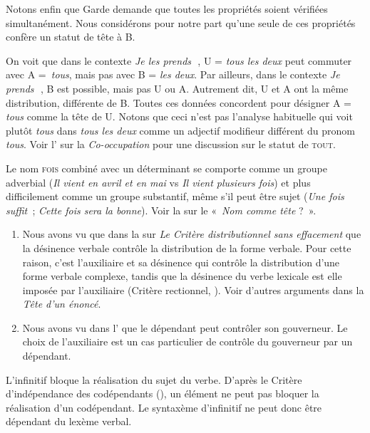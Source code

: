 {    Notons enfin que Garde demande que toutes les propriétés soient vérifiées simultanément. Nous considérons pour notre part qu’une seule de ces propriétés confère un statut de tête à B.


     On voit que dans le contexte \textit{Je les prends}~{\longrule}\,, U = \textit{tous les deux} peut commuter avec A =~\textit{tous}, mais pas avec B = \textit{les deux}. Par ailleurs, dans le contexte \textit{Je prends}~{\longrule}\,, B est possible, mais pas U ou A. Autrement dit, U et A ont la même distribution, différente de B. Toutes ces données concordent pour désigner A = \textit{tous} comme la tête de U. Notons que ceci n'est pas l'analyse habituelle qui voit plutôt \textit{tous} dans \textit{tous les deux} comme un adjectif modifieur différent du pronom \textit{tous}. Voir l’ sur la \textit{Co-occupation} pour une discussion sur le statut de \textsc{tout}.

     Le nom \textsc{fois} combiné avec un déterminant se comporte comme un groupe adverbial (\textit{Il vient en avril et en mai} vs \textit{Il vient plusieurs fois}) et plus difficilement comme un groupe substantif, même s’il peut être sujet (\textit{Une fois suffit~}; \textit{Cette fois sera la bonne}). Voir la  sur le «~\textit{Nom comme tête} ?~».

    \tcbbreak{}
    \begin{enumerate}[label=\alph*.]
    \item Nous avons vu que dans la  sur \textit{Le Critère distributionnel sans effacement} que la désinence verbale contrôle la distribution de la forme verbale. Pour cette raison, c'est l’auxiliaire et sa désinence qui contrôle la distribution d'une forme verbale complexe, tandis que la désinence du verbe lexicale est elle imposée par l'auxiliaire (Critère rectionnel, ). Voir d’autres arguments dans la  \textit{Tête d’un énoncé}.

    \item Nous avons vu dans l' que le dépendant peut contrôler son gouverneur. Le choix de l’auxiliaire est un cas particulier de contrôle du gouverneur par un dépendant.
    \end{enumerate}

     L’infinitif bloque la réalisation du sujet du verbe. D’après le Critère d’indépendance des codépendants (), un élément ne peut pas bloquer la réalisation d’un codépendant. Le syntaxème d’infinitif ne peut donc être dépendant du lexème verbal.

}
